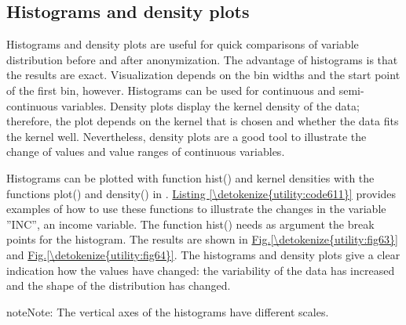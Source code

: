 \documentclass[letterpaper,10pt,english]{sphinxmanual}
\begin{document}
\subsection{Histograms and density plots}
\label{\detokenize{utility:histograms-and-density-plots}}
Histograms and density plots are useful for quick comparisons of
variable distribution before and after anonymization. The advantage of
histograms is that the results are exact. Visualization depends on the
bin widths and the start point of the first bin, however. Histograms can
be used for continuous and semi-continuous variables. Density plots
display the kernel density of the data; therefore, the plot depends on
the kernel that is chosen and whether the data fits the kernel well.
Nevertheless, density plots are a good tool to illustrate the change of
values and value ranges of continuous variables.

Histograms can be plotted with function hist() and kernel densities with
the functions plot() and density() in . \hyperref[\detokenize{utility:code611}]{Listing \ref{\detokenize{utility:code611}}} provides
examples of how to use these functions to illustrate the changes in the
variable ”INC”, an income variable. The function hist() needs as
argument the break points for the histogram. The results are shown in
\hyperref[\detokenize{utility:fig63}]{Fig.\@ \ref{\detokenize{utility:fig63}}} and \hyperref[\detokenize{utility:fig64}]{Fig.\@ \ref{\detokenize{utility:fig64}}}. The histograms and density plots give a clear
indication how the values have changed: the variability of the data has
increased and the shape of the distribution has changed.

\begin{sphinxadmonition}{note}{Note:}
The vertical axes of the histograms have different scales.
\end{sphinxadmonition}
\end{document}

